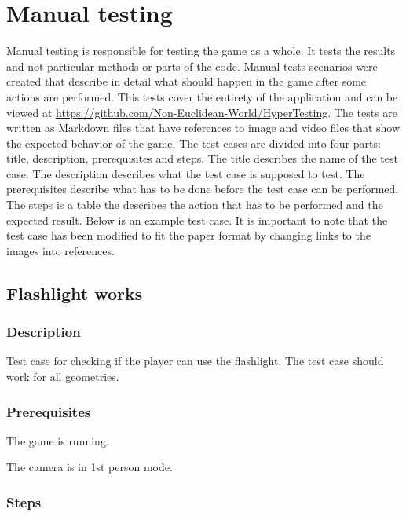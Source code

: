 \section{Manual testing} \label{sec:manual_testing}
Manual testing is responsible for testing the game as a whole.
It tests the results and not particular methods or parts of the code.
Manual tests scenarios were created that describe in detail what should happen in the game after some actions are performed.
This tests cover the entirety of the application and can be viewed at \url{https://github.com/Non-Euclidean-World/HyperTesting}.
The tests are written as Markdown files that have references to image and video files that show the expected behavior of the game.
The test cases are divided into four parts: title, description, prerequisites and steps.
The title describes the name of the test case.
The description describes what the test case is supposed to test.
The prerequisites describe what has to be done before the test case can be performed.
The steps is a table the describes the action that has to be performed and the expected result.
Below is an example test case. 
It is important to note that the test case has been modified to fit the paper format by changing links to the images into references.


\subsection*{Flashlight works}\label{flashlight-works}

\subsubsection*{Description}\label{description}

Test case for checking if the player can use the flashlight. The test
case should work for all geometries.

\subsubsection*{Prerequisites}\label{prerequisites}

The game is running.

The camera is in 1st person mode.

\subsubsection*{Steps}\label{steps}

